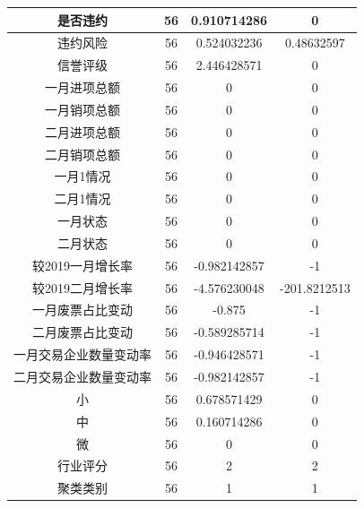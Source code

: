 \documentclass[UTF8]{ctexart}
\begin{document}
\begin{center}
\begin{longtable}{|c|c|c|c|}
		是否违约                   & 56   & 0.910714286  & 0            \\ \hline
		违约风险                   & 56   & 0.524032236  & 0.48632597   \\ \hline
		信誉评级                   & 56   & 2.446428571  & 0            \\ \hline
		一月进项总额               & 56   & 0            & 0            \\ \hline
		一月销项总额               & 56   & 0            & 0            \\ \hline
		二月进项总额               & 56   & 0            & 0            \\ \hline
		二月销项总额               & 56   & 0            & 0            \\ \hline
		一月1情况                  & 56   & 0            & 0            \\ \hline
		二月1情况                  & 56   & 0            & 0            \\ \hline
		一月状态                   & 56   & 0            & 0            \\ \hline
		二月状态                   & 56   & 0            & 0            \\ \hline
		较2019一月增长率           & 56   & -0.982142857 & -1           \\ \hline
		较2019二月增长率           & 56   & -4.576230048 & -201.8212513 \\ \hline
		一月废票占比变动           & 56   & -0.875       & -1           \\ \hline
		二月废票占比变动           & 56   & -0.589285714 & -1           \\ \hline
		一月交易企业数量变动率     & 56   & -0.946428571 & -1           \\ \hline
		二月交易企业数量变动率     & 56   & -0.982142857 & -1           \\ \hline
		小                         & 56   & 0.678571429  & 0            \\ \hline
		中                         & 56   & 0.160714286  & 0            \\ \hline
		微                         & 56   & 0            & 0            \\ \hline
		行业评分                   & 56   & 2            & 2            \\ \hline
		聚类类别                   & 56   & 1            & 1            \\ \hline
	\end{longtable}
\end{center}
\end{document}
